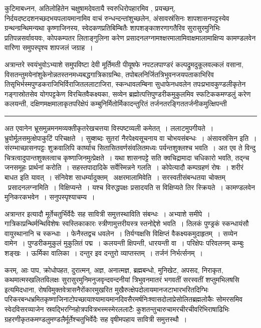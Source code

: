 \documentclass[11pt, openany]{book}
\begin{document}
\newpage
\lfoot{}

\noindent
कुटिमाबध्नन, अतिलोहितेन चक्षुषामदेवतायै स्वरुधिरोपहारमिव , प्रयच्छन्, निर्दयदष्टदशनच्छदभयपलायमानामिव वाचं रुन्धन्दन्तांशुच्छलेन, अंसावस्रंसिनः शापशासनपट्टस्येव ग्रन्थन्ग्रन्थिमन्यथा कृष्णाजिनस्य, स्वेदकणप्रतिबिम्बितैः शापशङ्काशरणागतैरिव सुरासुरमुनिभिः प्रतिपन्नसर्वावयवः, कोपकम्पतर लिताङ्गुलिना करेण प्रसादनलग्नामश्क्षरमालामिवाक्षमालामाक्षिप्य कामण्डलवेन वारिणा समुपस्पृश्य शापजलं जग्राह~।

अत्रान्तरे स्वयंभुवोऽभ्याशे समुपविष्टा देवी मूर्तिमती पीयूषफे नपटलपाण्डरं कल्पद्रुमदुकूलवल्कलं वसाना, विसतन्तुमयेनांशुकेनोन्नतस्तनमध्यबद्धगात्रिकाग्रन्थिः, तपोबलनिर्जितत्रिभुवनजयपताकाभिरिव तिसृभिर्भस्मपुण्डकराजिभिर्विराजितललाटाजिरा, स्कन्धावलम्बिना सुधाफेनधवलेन तपःप्रभावकुण्डलीकृतेन गङ्गास्रोतसेव योगपट्टकेण विरचितवैकक्ष्यका, सव्येन ब्रह्मोत्पत्तिपुण्डरीकमुकुलमिव स्फटिककमण्डलुं करेण कलयन्ती, दक्षिणमक्षमालाकृतपरिक्षेपं कम्बुनिर्मितोर्मिकादन्तुरितं तर्जनतरङ्गिततर्जनीकमुत्क्षिपन्ती

\vspace{2mm}
\hrule

\noindent
{\s अत एवानेन भ्रूसमुन्नमनमव्यक्तीकृतरेखचत्तया विस्पष्टव्यली कमेतत्~। {\qt ललाटमुपगीयते~। भ्रुवोर्मूलसमुत्क्षेपाकुटिं परिचक्षते}~। सुब्शब्दः सुतरां नैरपेक्ष्यसूचनाय वा चोभयसंबन्धः~। {\qtt अंसावस्रंसिन इति}~। संरम्भाच्छासनपट्टः शुक्रवालिपि कार्ष्याच सितासितवर्णसंवलितमध्यः पर्यन्तशुक्लश्च भवति~। अत एव ते विन्दु चित्रत्वादुपान्तशुक्लत्वाच कृष्णाजिनमुत्प्रेक्षते~। यथा शासनपट्टे सति क्वचिद्रामादा चधिकारो भवति, तद्न्च जनसमूहः प्रार्थनां करोति~। सहस्तपादादिके सर्वेस्मिन्नने गलति~। कोपेत्यादौ कम्पग्रहणं रोषः~। शरीरं बाधत इति यावत्~। संनिवेश साधर्म्यादुक्तम् \textendash\ {\qtt अक्षरमालामिवेति}~। सरस्वतीसंबन्धतया चोक्तम् \textendash\ {\qtt प्रसादनलग्नामिति}~। विक्षिप्यन्ते~। यश्च विरुद्धपक्षः प्रसादयति स विक्षिप्यते तिर स्क्रियते~। कामण्डलवेन मुनिकरकभवेन~। सनुपस्पृश्याचम्य~।

अत्रान्तर इत्यादौ मूर्तेचतुर्भिर्वेदैः सह सावित्री समुत्तस्थाविति संबन्धः~। अभ्याशे समीपे~। गात्रिकाप्रन्थिर्मन्थिविशेषः स्वस्तिकाकारः स्त्रीणामुत्तरीयस्त्र स्तनोद्देशे भवति~। तिलकं पुण्ड्रकं स्कन्धायंसौ वायुस्थानानि च स्कन्धाः~। फेनैस्तद्वच धवलेन~। {\qt तिर्यग्वक्षसि विक्षिप्तं वैकक्ष्यकमुदाहृतम्}~। सव्येन वामेन~। पुण्डरीकमुकुलं मुकुलितं पद्म~। कलयन्ती क्षिपन्ती, धारयन्ती वा~। परिक्षेपः परिवलनम् कम्बुः शङ्खः~। ऊर्मिका वालिका~। दन्तुर इव दन्तुरो व्याप्तस्तम्~। तर्जनं निर्भर्त्सनम्~।}

\newpage

\noindent
करम्, आः पाप, क्रोधोपहत, दुरात्मन्, अज्ञ, अनात्मज्ञ, ब्रह्मबन्धो, मुनिखेट, अपसद, निराकृत, कथमात्मस्खलितविलक्षः सुरासुरमुनिमनुजवृन्दवन्दनीयां त्रिभुवनमातरं भगवतीं सरस्वतीं शप्तुमभिलषसि इत्यमिदधाना, रोषविमुक्तवेत्रासनैरोंकारमुखरित मुखैरुत्क्षेपदोलायमानजटाभारभरितदिग्भिः परिकरबन्धभ्रमितकृष्णाजिनाटोपच्छायाश्यामायमानदिवसैरमर्षनिःश्वासदोलाप्रेसोलितब्रह्मलोकैः सोमरसमिव स्वेदविसरव्याजेन स्रवद्भिरग्निहोत्रपवित्रभस्मस्मेरललाटैः कुशतन्तुचारुचामरचीरचीवरिभिराषाढिभिः ग्रहरणीकृतकमण्डलुमण्डलैर्मूर्तेश्चतुभिर्वेदैः सह वृषीमपहाय सावित्री समुत्तस्थौ~।
\end{document}
